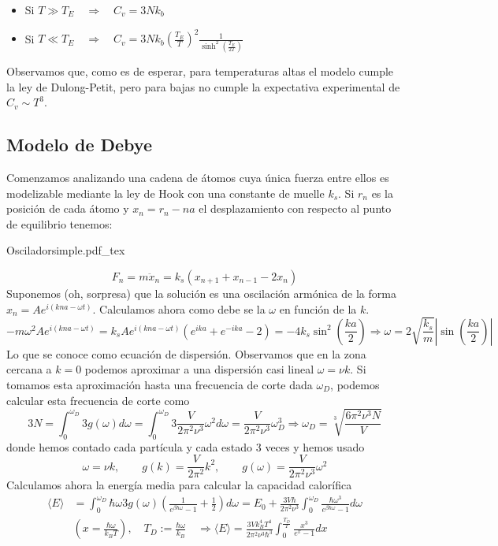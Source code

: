 \documentclass[leqno]{article}
\newcommand{\incfig}[1]{%
\center
\def\svgwidth{0.9\columnwidth}
{#1.pdf_tex}
}
\begin{document}
\begin{itemize}[topsep=-6pt, itemsep=0pt]
  \item Si  $T\gg T_E \quad \Rightarrow \quad C_v = 3Nk_b$
  \item Si  $T\ll T_E \quad \Rightarrow \quad C_v = 3Nk_b (\frac{T_E}{T})^2 \frac{1}{\sinh ^2(\frac{T_E}{2T})}$
\end{itemize}

Observamos que, como es de esperar, para temperaturas altas el modelo cumple la ley de Dulong-Petit, pero para bajas no cumple la expectativa experimental de $C_v \sim  T^3$.


\subsection{Modelo de Debye}
\begin{minipage}{0.7\textwidth}
Comenzamos analizando una cadena de átomos cuya única fuerza entre ellos es modelizable mediante la ley de Hook con una constante de muelle $k_s$. Si  $r_n$ es la posición de cada átomo y $x_n = r_n-na$ el desplazamiento con respecto al punto de equilibrio tenemos:
\end{minipage}
\begin{minipage}{0.3\textwidth}
  \incfig{Osciladorsimple}
\end{minipage}
 \[
F_n =m\ddot{x}_n = k_s(x_{n+1}+x_{n-1}-2x_n)
\] 
Suponemos (oh, sorpresa) que la solución es una oscilación armónica de la forma $x_n = A e^{i(kna-\omega t)}$. Calculamos ahora como debe se la $\omega $ en función de la $k$.
 \[
   -m\omega ^2 Ae^{i(kna-\omega t)} = k_sAe^{i(kna-\omega t)}(e^{ika}+e^{-ika}-2) = -4k_s \sin^2\left( \frac{ka}{2} \right)  \Rightarrow \boxed{\omega = 2 \sqrt{\frac{k_s}{m}}\left|\sin \left( \frac{ka}{2} \right) \right| }
\] 
Lo que se conoce como ecuación de dispersión. Observamos que en la zona cercana a $k=0$ podemos aproximar a una dispersión casi lineal  $\omega =\nu k$. Si tomamos esta aproximación hasta una frecuencia de corte dada $\omega _D$, podemos calcular esta frecuencia de corte como
\[
  3N = \int_0^{\omega _D} 3g(\omega )d\omega =\int_0^{\omega _D}3 \frac{V}{2\pi^2\nu^3}\omega ^2 d\omega = \frac{V}{2\pi^2 \nu^3}\omega _D^3 \Rightarrow \boxed{\omega _D = \sqrt[3]{\frac{6\pi^2\nu^3N}{V}} }
\] 
donde hemos contado cada partícula y cada estado 3 veces y hemos usado
\[
\omega = \nu k, \qquad g(k)=\frac{V}{2\pi^2}k^2, \qquad g(\omega )= \frac{V}{2\pi^2 \nu^3}\omega ^2
\]
Calculamos ahora la energía media para calcular la capacidad calorífica
\begin{align*}
  \langle E \rangle &= \int_0^{\omega _D}\hbar \omega 3g(\omega )\left( \frac{1}{e^{\beta \hbar \omega }-1} +\frac{1}{2} \right) d\omega  = E_0 + \frac{3V\hbar }{2\pi^2\nu^3} \int_0^{\omega _D}\frac{\hbar \omega ^3}{e^{\beta \hbar \omega }-1} d\omega \\
	   & (x=\frac{\hbar \omega }{k_B T}), \quad T_D := \frac{\hbar \omega }{k_B} \quad   \Rightarrow  \boxed{\langle E \rangle = \frac{3Vk_B^4T^4}{2\pi^2\nu^3\hbar ^3}\int_0^{\frac{T_D}{T}}\frac{x^3}{e^x-1}dx }
\end{align*}
\end{document}
